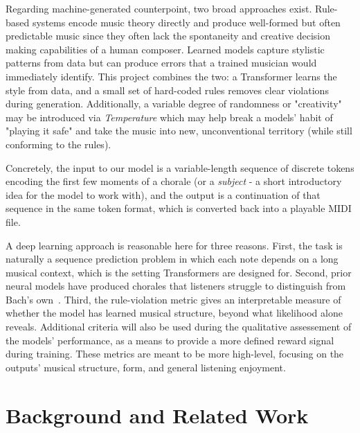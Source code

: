 \documentclass{article}
\begin{document}
Regarding machine-generated counterpoint, two broad approaches exist. Rule-based systems encode music theory directly and produce well-formed but often predictable music since they often lack the spontaneity and creative decision making capabilities of a human composer. Learned models capture stylistic patterns from data but can produce errors that a trained musician would immediately identify. This project combines the two: a Transformer learns the style from data, and a small set of hard-coded rules removes clear violations during generation. Additionally, a variable degree of randomness or "creativity" may be introduced via \emph{Temperature} which may help break a models' habit of "playing it safe" and take the music into new, unconventional territory (while still conforming to the rules).

Concretely, the input to our model is a variable-length sequence of discrete tokens encoding the first few moments of a chorale (or a \emph{subject} - a short introductory idea for the model to work with), and the output is a continuation of that sequence in the same token format, which is converted back into a playable MIDI file.

A deep learning approach is reasonable here for three reasons. First, the task is naturally a sequence prediction problem in which each note depends on a long musical context, which is the setting Transformers are designed for. Second, prior neural models have produced chorales that listeners struggle to distinguish from Bach's own~\cite{hadjeres2017deepbach, liang2016bachbot}. Third, the rule-violation metric gives an interpretable measure of whether the model has learned musical structure, beyond what likelihood alone reveals. Additional criteria will also be used during the qualitative assessement of the models' performance, as a means to provide a more defined reward signal during training. These metrics are meant to be more high-level, focusing on the outputs' musical structure, form, and general listening enjoyment.

\section{Background and Related Work}
\end{document}
